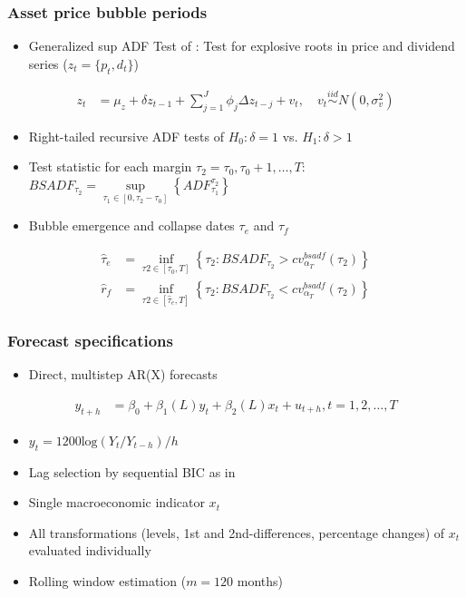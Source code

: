 \documentclass [handout] {beamer} %
\begin{document}
\begin{frame}
\frametitle{Asset price bubble periods}
	\begin{itemize}
		\item Generalized sup ADF Test of \cite{psy13}: Test for explosive roots in price and dividend series ($z_t = \{p_t,d_t\}$)
	\end{itemize}
	\begin{align*}
		z_t &= \mu_z + \delta z_{t-1} + \sum_{j=1}^{J}\phi_j\Delta z_{t-j} + v_t, \quad v_t \stackrel{iid}{\sim} N(0,\sigma^2_v)
	\end{align*}
	\begin{itemize}
		\item Right-tailed recursive ADF tests of $H_0: \delta=1$ vs. $H_1: \delta>1$
		\item Test statistic for each margin $\tau_2=\tau_0,\tau_0+1,\dots,T$: $BSADF_{\tau_2} = \sup\limits_{\tau_1 \in [0,\tau_2-\tau_0]}\left\lbrace ADF_{\tau_1}^{\tau_2}\right\rbrace$
		\item Bubble emergence and collapse dates $\tau_e$ and $\tau_f$
	\end{itemize}
	\begin{align*}
		\hat{\tau}_e &= \inf\limits_{\tau2 \in [\tau_0,T]} \left\lbrace \tau_2: BSADF_{\tau_2} > cv^{bsadf}_{\alpha_T}(\tau_2)\right\rbrace \nonumber \\
		\hat{r}_f &= \inf\limits_{\tau2 \in [\hat{\tau}_e,T]} \left\lbrace \tau_2: BSADF_{\tau_2} < cv^{bsadf}_{\alpha_T}(\tau_2)\right\rbrace
	\end{align*}
\end{frame}

\begin{frame}
\frametitle{Forecast specifications}
	\begin{itemize}
		\item Direct, multistep AR(X) forecasts
	\end{itemize}	
	\begin{align*}
	y_{t+h} &= \beta_0 + \beta_1(L)y_t + \beta_2(L)x_t + u_{t+h}, t=1,2,\dots,T
	\end{align*}
	\begin{itemize}
		\item $y_t=1200 \text{log}(Y_t/Y_{t-h})/h$
		\item Lag selection by sequential BIC as in \cite{rossi10}
		\item Single macroeconomic indicator $x_t$%
		\item All transformations (levels, 1st and 2nd-differences, percentage changes) of $x_t$ evaluated individually
		\item Rolling window estimation ($m=120$ months)
	\end{itemize}
\end{frame}
\end{document}
